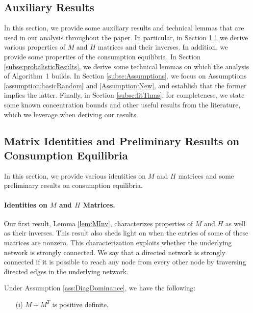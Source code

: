 \documentclass[opre,nonblindrev]{informs3} %
\begin{document}
\begin{APPENDIX}{}
\section{Auxiliary Results}  \label{app:auxResults}

In this section, we provide some auxiliary results and technical lemmas
that are used in our analysis throughout the paper.
In particular, in Section \ref{subse:MatrixLemma} 
we derive various properties of
 $M$ and $H$ matrices and their inverses.
 In addition, we provide some properties of the consumption equilibria.
 In Section \ref{subse:probalisticResults}, we 
 derive some technical lemmas on which the analysis of Algorithm~1 builds.
 In Section \ref{subse:Assumptions}, we focus on Assumptions	
  \ref{assumption:basicRandom} and  \ref{Assumption:New}, and establish that the former implies the latter.
 Finally, in Section \ref{subse:litThms}, for completeness, we state some known 
 concentration bounds  and other useful results from the literature, which 
we leverage when deriving our results.
 	
 	\subsection{Matrix Identities and Preliminary Results on Consumption Equilibria} \label{subse:MatrixLemma}

In this section, we provide various identities
on $M$ and $H$ matrices and some preliminary results on consumption equilibria.

\paragraph{Identities on $M$ and $H$ Matrices.}
Our first result,
Lemma \ref{lem:MInv},
characterizes  properties of $M$ and $H$ as well as their inverses.
This result also sheds light on when the entries of some of these matrices are nonzero.
This characterization exploits  whether the underlying network is strongly connected. We say that a directed network is strongly connected if it is possible to reach  any node from every other node by traversing directed edges in the underlying network. 	
 	
\begin{lemma}\label{lem:MInv}
	Under Assumption \ref{ass:DiagDominance}, we have the following:
	\begin{itemize}
		\item[(i)] 	$M+M^T$ is positive definite.
		

\end{itemize}
\end{lemma}
\end{APPENDIX}
\end{document}
